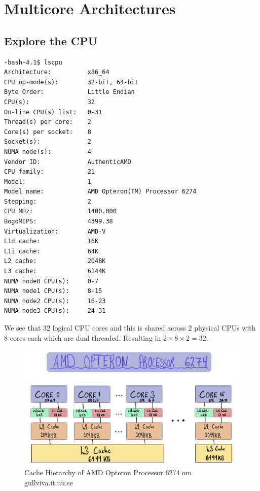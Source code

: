 \section{Multicore Architectures}

\subsection{Explore the CPU}

\begin{lstlisting}[caption=Output from lscpu command]
-bash-4.1$ lscpu
Architecture:          x86_64
CPU op-mode(s):        32-bit, 64-bit
Byte Order:            Little Endian
CPU(s):                32
On-line CPU(s) list:   0-31
Thread(s) per core:    2
Core(s) per socket:    8
Socket(s):             2
NUMA node(s):          4
Vendor ID:             AuthenticAMD
CPU family:            21
Model:                 1
Model name:            AMD Opteron(TM) Processor 6274
Stepping:              2
CPU MHz:               1400.000
BogoMIPS:              4399.38
Virtualization:        AMD-V
L1d cache:             16K
L1i cache:             64K
L2 cache:              2048K
L3 cache:              6144K
NUMA node0 CPU(s):     0-7
NUMA node1 CPU(s):     8-15
NUMA node2 CPU(s):     16-23
NUMA node3 CPU(s):     24-31
\end{lstlisting}

We see that 32 logical CPU cores and this is shared across 2 physical CPUs with
8 cores each which are dual threaded. Resulting in $2 \times 8 \times 2 = 32$.

\begin{figure}
    \centering
    \includegraphics[width=\linewidth]{Figures/datahierarchy.PNG}
    \caption{Cache Hierarchy of AMD Opteron Processor 6274 om gullviva.it.uu.se}
\end{figure}

